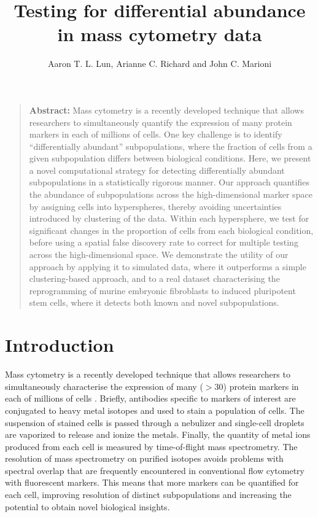 \documentclass{article}
\title{Testing for differential abundance in mass cytometry data}
\author{Aaron T. L. Lun, Arianne C. Richard and John C. Marioni}
\begin{document}
\maketitle

\begin{quote}
\textbf{Abstract:} Mass cytometry is a recently developed technique that allows researchers to simultaneously quantify the expression of many protein markers in each of millions of cells. 
One key challenge is to identify ``differentially abundant'' subpopulations, where the fraction of cells from a given subpopulation differs between biological conditions. 
Here, we present a novel computational strategy for detecting differentially abundant subpopulations in a statistically rigorous manner. 
Our approach quantifies the abundance of subpopulations across the high-dimensional marker space by assigning cells into hyperspheres, thereby avoiding uncertainties introduced by clustering of the data. 
Within each hypersphere, we test for significant changes in the proportion of cells from each biological condition, before using a spatial false discovery rate to correct for multiple testing across the high-dimensional space. 
We demonstrate the utility of our approach by applying it to simulated data, where it outperforms a simple clustering-based approach, and to a real dataset characterising the reprogramming of murine embryonic fibroblasts to induced pluripotent stem cells, where it detects both known and novel subpopulations.
\end{quote}

\section{Introduction}
Mass cytometry is a recently developed technique that allows researchers to simultaneously characterise the expression of many ($>30$) protein markers in each of millions of cells \cite{ornatsky2008study}.
Briefly, antibodies specific to markers of interest are conjugated to heavy metal isotopes and used to stain a population of cells.
The suspension of stained cells is passed through a nebulizer and single-cell droplets are vaporized to release and ionize the metals.
Finally, the quantity of metal ions produced from each cell is measured by time-of-flight mass spectrometry.
The resolution of mass spectrometry on purified isotopes avoids problems with spectral overlap that are frequently encountered in conventional flow cytometry with fluorescent markers.
This means that more markers can be quantified for each cell, improving resolution of distinct subpopulations and increasing the potential to obtain novel biological insights.
\end{document}
